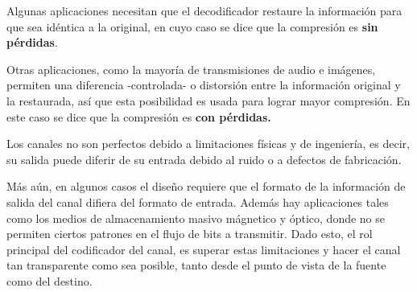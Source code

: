 Algunas aplicaciones necesitan que el decodificador restaure la información para que sea idéntica a la original, en cuyo caso se dice que la compresión es \textbf{sin pérdidas}.

Otras aplicaciones, como la mayoría de transmisiones de audio e imágenes, permiten una diferencia -controlada- o distorsión entre la información original y la restaurada, así que esta posibilidad es usada para lograr mayor compresión. En este caso se dice que la compresión es \textbf{con pérdidas.}

Los canales no son perfectos debido a limitaciones físicas y de ingeniería, es decir, su salida puede diferir de su entrada debido al ruido o a defectos de fabricación.

Más aún, en algunos casos el diseño requiere que el formato de la información de salida del canal difiera del formato de entrada. Además hay aplicaciones tales como los medios de almacenamiento masivo mágnetico y óptico, donde no se permiten ciertos patrones en el flujo de bits a transmitir. Dado esto, el rol principal del codificador del canal, es superar estas limitaciones y hacer el canal tan transparente  como sea posible, tanto desde el punto de vista de la fuente como del destino. 

